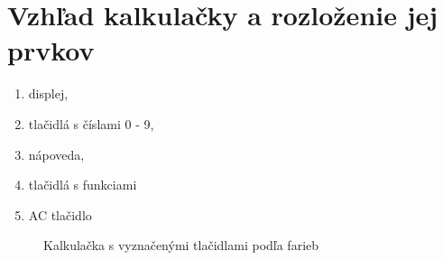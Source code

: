 \documentclass[a4paper, 11pt]{article}
\begin{document}
                    
                    
        
    \newpage
        
    \section{Vzhľad kalkulačky a rozloženie jej prvkov}
        \begin{enumerate}
            \color{blue}
            \item displej,
            \color{red}
            \item tlačidlá s číslami 0 - 9,
            \color{green}
            \item nápoveda,
            \color{yellow}
            \item tlačidlá s funkciami
            \color{purple}
            \item AC tlačidlo
        \end{enumerate}
        \vspace{15mm}
        \begin{figure}[h]
    		        \centering
    			        \caption{Kalkulačka s vyznačenými tlačidlami podľa farieb}
    	\end{figure}
    	
\end{document}
